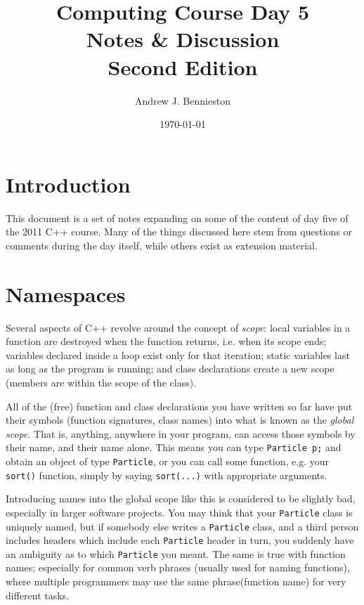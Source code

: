 \documentclass[a4paper]{scrartcl}
\title{Computing Course Day 5\\
Notes \& Discussion\\
Second Edition}
\author{Andrew J. Bennieston}
\date{\today}
\begin{document}
\maketitle

\tableofcontents

\listoffigures

\pagebreak

\section{Introduction}\label{sec:introduction}
This document is a set of notes expanding on some of the content of day five of the 2011 C++ course. Many of the things discussed here stem from questions or comments during the day itself, while others exist as extension material.

\section{Namespaces}
Several aspects of C++ revolve around the concept of \emph{scope}: local variables in a function are destroyed when the function returns, i.e. when its scope ends; variables declared inside a loop exist only for that iteration; static variables last as long as the program is running; and class declarations create a new scope (members are within the scope of the class).

All of the (free) function and class declarations you have written so far have put their symbols (function signatures, class names) into what is known as the \emph{global scope}. That is, anything, anywhere in your program, can access those symbols by their name, and their name alone. This means you can type \texttt{Particle p;} and obtain an object of type \texttt{Particle}, or you can call some function, e.g. your \verb|sort()| function, simply by saying \verb|sort(...)| with appropriate arguments.

Introducing names into the global scope like this is considered to be slightly bad, especially in larger software projects. You may think that your \texttt{Particle} class is uniquely named, but if somebody else writes a \texttt{Particle} class, and a third person includes headers which include each \texttt{Particle} header in turn, you suddenly have an ambiguity as to which \texttt{Particle} you meant. The same is true with function names; especially for common verb phrases (usually used for naming functions), where multiple programmers may use the same phrase(function name) for very different tasks.
\end{document}
